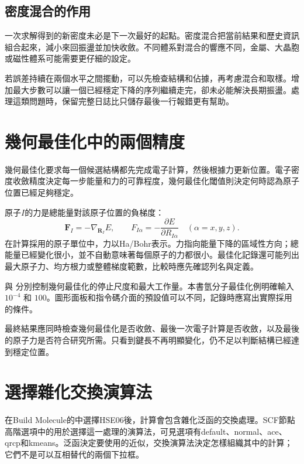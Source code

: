 \subsection{密度混合的作用}

一次求解得到的新密度未必是下一次最好的起點。密度混合把當前結果和歷史資訊組合起來，減小來回振盪並加快收斂。不同體系對混合的響應不同，金屬、大晶胞或磁性體系可能需要更仔細的設定。

若誤差持續在兩個水平之間擺動，可以先檢查結構和佔據，再考慮混合和取樣。增加最大步數可以讓一個已經穩定下降的序列繼續走完，卻未必能解決長期振盪。處理這類問題時，保留完整日誌比只儲存最後一行報錯更有幫助。

\section{幾何最佳化中的兩個精度}

幾何最佳化要求每一個候選結構都先完成電子計算，然後根據力更新位置。電子密度收斂精度決定每一步能量和力的可靠程度，幾何最佳化閾值則決定何時認為原子位置已經足夠穩定。


原子$I$的力是總能量對該原子位置的負梯度：
\begin{equation}
  \mathbf F_I=-\nabla_{\mathbf R_I}E,
  \qquad F_{I\alpha}=-\frac{\partial E}{\partial R_{I\alpha}}
  \quad(\alpha=x,y,z).
  \label{eq:atomic-force}
\end{equation}
在計算採用的原子單位中，力以Ha/Bohr表示。力指向能量下降的區域性方向；總能量已經變化很小，並不自動意味著每個原子的力都很小。最佳化記錄還可能列出最大原子力、均方根力或整體梯度範數，比較時應先確認列名與定義。

 與  分別控制幾何最佳化的停止尺度和最大工作量。本書氫分子最佳化例明確輸入 $10^{-4}$ 和 $100$。圖形面板和指令碼介面的預設值可以不同，記錄時應寫出實際採用的條件。

最終結果應同時檢查幾何最佳化是否收斂、最後一次電子計算是否收斂，以及最後的原子力是否符合研究所需。只看到鍵長不再明顯變化，仍不足以判斷結構已經達到穩定位置。

\section{選擇雜化交換演算法}

在Build Molecule的中選擇HSE06後，計算會包含雜化泛函的交換處理。SCF節點高階選項中的用於選擇這一處理的演算法，可見選項有default、normal、ace、qrcp和kmeans。泛函決定要使用的近似，交換演算法決定怎樣組織其中的計算；它們不是可以互相替代的兩個下拉框。

